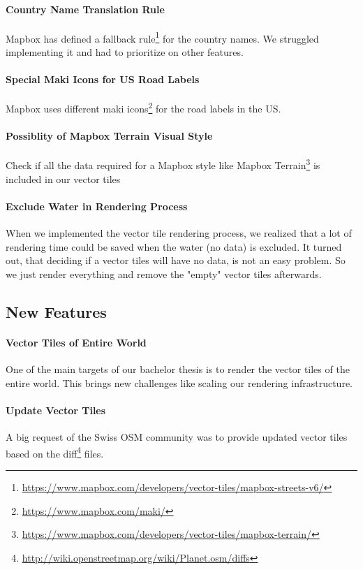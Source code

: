 \paragraph{Country Name Translation Rule}
Mapbox has defined a fallback rule\footnote{\url{https://www.mapbox.com/developers/vector-tiles/mapbox-streets-v6/}} for the country names. We struggled implementing it and had to prioritize on other features.

\paragraph{Special Maki Icons for US Road Labels}
Mapbox uses different maki icons\footnote{\url{https://www.mapbox.com/maki/}} for the road labels in the US.  

\paragraph{Possiblity of Mapbox Terrain Visual Style}
Check if all the data required for a Mapbox style like Mapbox Terrain\footnote{\url{https://www.mapbox.com/developers/vector-tiles/mapbox-terrain/}} is included in our vector tiles

\paragraph{Exclude Water in Rendering Process}
When we implemented the vector tile rendering process, we realized that a lot of rendering time could be saved when the water (no data) is excluded. It turned out, that deciding if a vector tiles will have no data, is not an easy problem. So we just render everything and remove the "empty" vector tiles afterwards.

\subsection{New Features}\label{new_features}

\paragraph{Vector Tiles of Entire World}
One of the main targets of our bachelor thesis is to render the vector tiles of the entire world. This brings new challenges like scaling our rendering infrastructure. 

\paragraph{Update Vector Tiles}
A big request of the Swiss OSM community was to provide updated vector tiles based on the diff\footnote{\url{http://wiki.openstreetmap.org/wiki/Planet.osm/diffs}} files.

